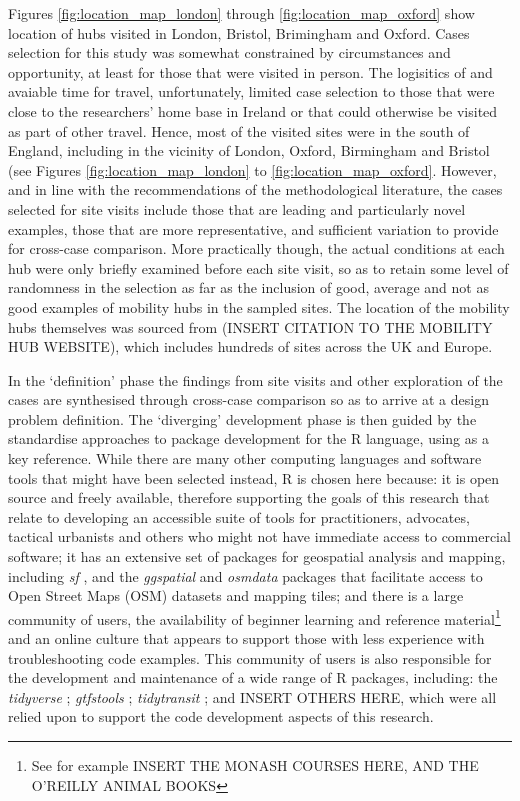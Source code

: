 \documentclass[preprint, 3p,
authoryear]{elsarticle} %
\begin{document}
Figures \ref{fig:location_map_london} through
\ref{fig:location_map_oxford} show location of hubs visited in London,
Bristol, Brimingham and Oxford. Cases selection for this study was
somewhat constrained by circumstances and opportunity, at least for
those that were visited in person. The logisitics of and avaiable time
for travel, unfortunately, limited case selection to those that were
close to the researchers' home base in Ireland or that could otherwise
be visited as part of other travel. Hence, most of the visited sites
were in the south of England, including in the vicinity of London,
Oxford, Birmingham and Bristol (see Figures
\ref{fig:location_map_london} to \ref{fig:location_map_oxford}. However,
and in line with the recommendations of the methodological literature,
the cases selected for site visits include those that are leading and
particularly novel examples, those that are more representative, and
sufficient variation to provide for cross-case comparison. More
practically though, the actual conditions at each hub were only briefly
examined before each site visit, so as to retain some level of
randomness in the selection as far as the inclusion of good, average and
not as good examples of mobility hubs in the sampled sites. The location
of the mobility hubs themselves was sourced from (INSERT CITATION TO THE
MOBILITY HUB WEBSITE), which includes hundreds of sites across the UK
and Europe.

In the `definition' phase the findings from site visits and other
exploration of the cases are synthesised through cross-case comparison
so as to arrive at a design problem definition. The `diverging'
development phase is then guided by the standardise approaches to
package development for the R language, using \citet{wickham2023r} as a
key reference. While there are many other computing languages and
software tools that might have been selected instead, R is chosen here
because: it is open source and freely available, therefore supporting
the goals of this research that relate to developing an accessible suite
of tools for practitioners, advocates, tactical urbanists and others who
might not have immediate access to commercial software; it has an
extensive set of packages for geospatial analysis and mapping, including
\emph{sf} \citep{R-sf}, and the \emph{ggspatial} and \emph{osmdata}
\citep[\citet{R-osmdata}]{R-ggspatial} packages that facilitate access
to Open Street Maps (OSM) datasets and mapping tiles; and there is a
large community of users, the availability of beginner learning and
reference material\footnote{See for example INSERT THE MONASH COURSES
  HERE, AND THE O'REILLY ANIMAL BOOKS} and an online culture that
appears to support those with less experience with troubleshooting code
examples. This community of users is also responsible for the
development and maintenance of a wide range of R packages, including:
the \emph{tidyverse} \citep{tidyverse2019}; \emph{gtfstools}
\citep{R-gtfstools}; \emph{tidytransit} \citep{R-tidytransit}; and
INSERT OTHERS HERE, which were all relied upon to support the code
development aspects of this research.
\end{document}
